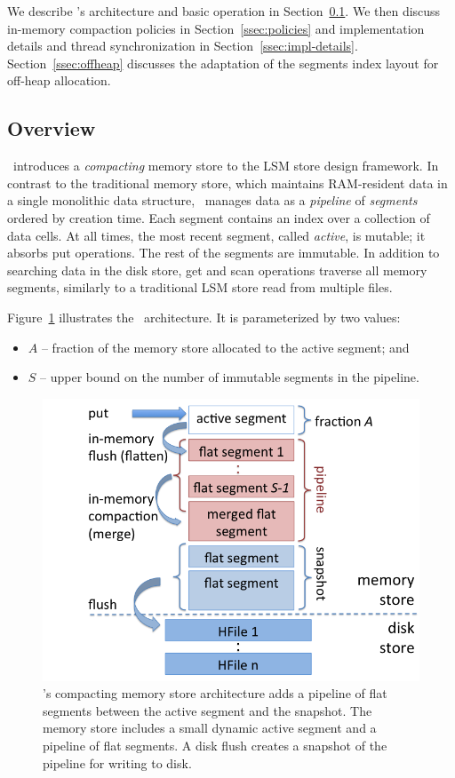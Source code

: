 
We describe  \sys's architecture and basic operation in Section~\ref{ssec:overview}.
We then discuss in-memory compaction policies  in  Section~\ref{ssec:policies}
and implementation details and thread synchronization in Section~\ref{ssec:impl-details}.
Section~\ref{ssec:offheap} discusses the adaptation of the segments index layout for off-heap allocation.


\subsection{Overview} \label{ssec:overview}


\sys\ introduces a \emph{compacting} memory store to the LSM store design framework. In contrast to the traditional memory store, 
which maintains RAM-resident data in a single monolithic data structure, \sys\ manages data as a \emph{pipeline} of 
\emph{segments} ordered by creation time. Each segment contains an index over a collection of data cells.
At all times, the most recent segment, called \emph{active}, is mutable;
it absorbs put operations. The rest of the segments are immutable.  
%
In addition to searching data in the disk store, get and scan operations traverse all memory segments,  similarly to a traditional LSM store read from multiple files. 
  
Figure~\ref{fig:accordion} illustrates the \sys\ architecture. It is parameterized by two values:
\begin{itemize}
\item  $A$ --  fraction of the memory store allocated to the active segment; and 
\item $S$ --  upper bound on the number of immutable segments in the pipeline. 
\end{itemize}

\begin{figure}[tb]
\center
\includegraphics[width=\columnwidth]{accordion-arch} 
\caption{\sys's compacting memory store architecture adds a pipeline of flat segments between the active segment and the snapshot. 
The memory store includes a small dynamic active segment 
and a pipeline of flat segments. A disk flush creates a snapshot of the pipeline for writing to disk.}
\label{fig:accordion}
\end{figure}

